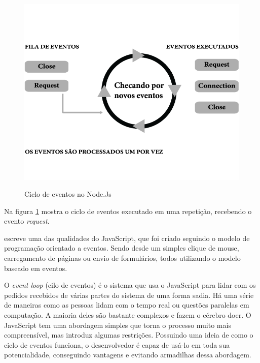   \begin{figure}[H]
  \setlength{\abovecaptionskip}{0pt}
  \setlength{\belowcaptionskip}{0pt}
  \caption[Ciclo de eventos no Node.Js]{Ciclo de eventos no Node.Js}
  \centering
  \includegraphics[width=.85\textwidth]{imagem/event-loop-caio-ribeiro.png}
  \captionsetup{justification=centering}
  \label{fig:event-loop}
  \end{figure}
  
  Na figura \ref{fig:event-loop} mostra o ciclo de eventos executado em uma repetição, recebendo o evento \textit{request}.
  
  \cite{Wilson:2013} escreve uma das qualidades do JavaScript, que foi criado seguindo o modelo de programação orientado 
  a eventos. Sendo desde um simples clique de mouse, carregamento de páginas ou envio de formulários, todos utilizando 
  o modelo baseado em eventos.
  
  O \textit{event loop} (cilo de eventos) é o sistema que usa o JavaScript para lidar com os pedidos recebidos de várias
  partes do sistema de uma forma sadia. Há uma série de maneiras como as pessoas lidam com o tempo real ou questões 
  paralelas em computação. 
  A maioria deles são bastante complexos e fazem o cérebro doer. 
  O JavaScript tem uma abordagem simples que torna o processo muito mais compreensível, mas introduz algumas restrições. 
  Possuindo uma ideia de como o ciclo de eventos funciona, o desenvolvedor é capaz de usá-lo em toda sua potencialidade, 
  conseguindo vantagens e evitando armadilhas dessa abordagem.\cite{Hughes:2012}
  
